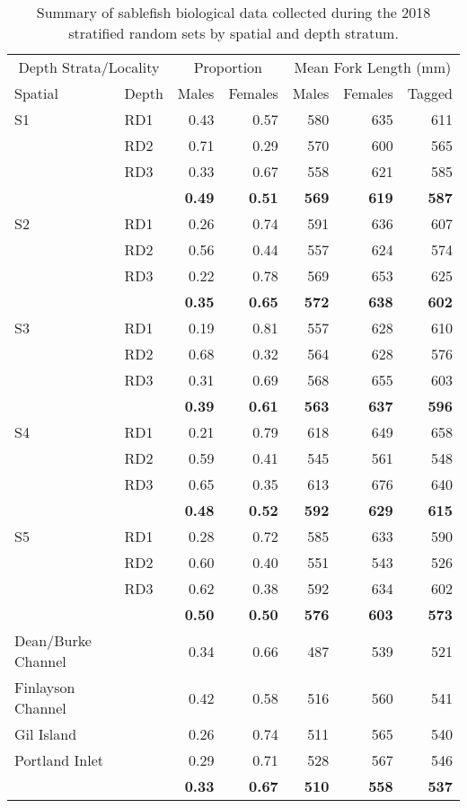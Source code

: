 \documentclass[12pt]{article}\usepackage[]{graphicx}\usepackage[]{color}
\begin{document}
\begin{table}

\caption{\label{tab:table7}Summary of sablefish biological data collected during the 2018 stratified random sets by spatial and depth stratum.}
\centering
\fontsize{8}{10}\selectfont
\begin{tabular}[t]{llrrrrr}
\toprule
\multicolumn{2}{c}{Depth Strata/Locality} & \multicolumn{2}{c}{Proportion} & \multicolumn{3}{c}{Mean Fork Length (mm)} \\
\cmidrule(l{3pt}r{3pt}){1-2} \cmidrule(l{3pt}r{3pt}){3-4} \cmidrule(l{3pt}r{3pt}){5-7}
Spatial & Depth & Males & Females & Males & Females & Tagged\\
\midrule
S1 & RD1 & 0.43 & 0.57 & 580 & 635 & 611\\
 & RD2 & 0.71 & 0.29 & 570 & 600 & 565\\
 & RD3 & 0.33 & 0.67 & 558 & 621 & 585\\
\hline
\textbf{} & \textbf{} & \textbf{0.49} & \textbf{0.51} & \textbf{569} & \textbf{619} & \textbf{587}\\
\hline
S2 & RD1 & 0.26 & 0.74 & 591 & 636 & 607\\
 & RD2 & 0.56 & 0.44 & 557 & 624 & 574\\
 & RD3 & 0.22 & 0.78 & 569 & 653 & 625\\
\hline
\textbf{} & \textbf{} & \textbf{0.35} & \textbf{0.65} & \textbf{572} & \textbf{638} & \textbf{602}\\
\hline
S3 & RD1 & 0.19 & 0.81 & 557 & 628 & 610\\
 & RD2 & 0.68 & 0.32 & 564 & 628 & 576\\
 & RD3 & 0.31 & 0.69 & 568 & 655 & 603\\
\hline
\textbf{} & \textbf{} & \textbf{0.39} & \textbf{0.61} & \textbf{563} & \textbf{637} & \textbf{596}\\
\hline
S4 & RD1 & 0.21 & 0.79 & 618 & 649 & 658\\
 & RD2 & 0.59 & 0.41 & 545 & 561 & 548\\
 & RD3 & 0.65 & 0.35 & 613 & 676 & 640\\
\hline
\textbf{} & \textbf{} & \textbf{0.48} & \textbf{0.52} & \textbf{592} & \textbf{629} & \textbf{615}\\
\hline
S5 & RD1 & 0.28 & 0.72 & 585 & 633 & 590\\
 & RD2 & 0.60 & 0.40 & 551 & 543 & 526\\
 & RD3 & 0.62 & 0.38 & 592 & 634 & 602\\
\hline
\textbf{} & \textbf{} & \textbf{0.50} & \textbf{0.50} & \textbf{576} & \textbf{603} & \textbf{573}\\
\hline
Dean/Burke Channel &  & 0.34 & 0.66 & 487 & 539 & 521\\
Finlayson Channel &  & 0.42 & 0.58 & 516 & 560 & 541\\
Gil Island &  & 0.26 & 0.74 & 511 & 565 & 540\\
Portland Inlet &  & 0.29 & 0.71 & 528 & 567 & 546\\
\hline
\textbf{} & \textbf{} & \textbf{0.33} & \textbf{0.67} & \textbf{510} & \textbf{558} & \textbf{537}\\
\bottomrule
\end{tabular}
\end{table}
\end{document}

